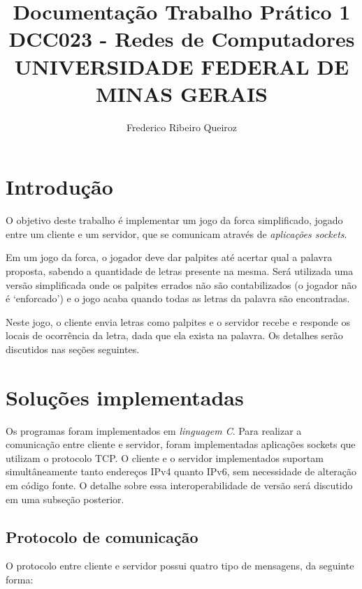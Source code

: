 \documentclass[12pt]{article}
\begin{document}
\title{%
    Documentação Trabalho Prático 1 \\
    \vspace{2em}
    \large DCC023 - Redes de Computadores \\
    UNIVERSIDADE FEDERAL DE MINAS GERAIS}

\author{Frederico Ribeiro Queiroz}
\maketitle

\section{Introdução}
O objetivo deste trabalho é implementar um jogo da forca simplificado, jogado entre um cliente e um servidor, que se comunicam através de \emph{aplicações sockets}. \par

Em um jogo da forca, o jogador deve dar palpites até acertar qual a palavra proposta, sabendo a quantidade de letras presente na mesma.
Será utilizada uma versão simplificada onde os palpites errados não são contabilizados (o jogador não é `enforcado') e o jogo acaba quando todas as letras da palavra são encontradas. \par

Neste jogo, o cliente envia letras como palpites e o servidor recebe e responde os locais de ocorrência da letra, dada que ela exista na palavra.
Os detalhes serão discutidos nas seções seguintes. \par

\section{Soluções implementadas}
Os programas foram implementados em \emph{linguagem C}. Para realizar a comunicação entre cliente e servidor, foram implementadas aplicações sockets que utilizam o protocolo TCP.
O cliente e o servidor implementados suportam simultâneamente tanto endereços IPv4 quanto IPv6, sem necessidade de alteração em código fonte. 
O detalhe sobre essa interoperabilidade de versão será discutido em uma subseção posterior.\par

\subsection{Protocolo de comunicação}
O protocolo entre cliente e servidor possui quatro tipo de mensagens, da seguinte forma:
\end{document}
